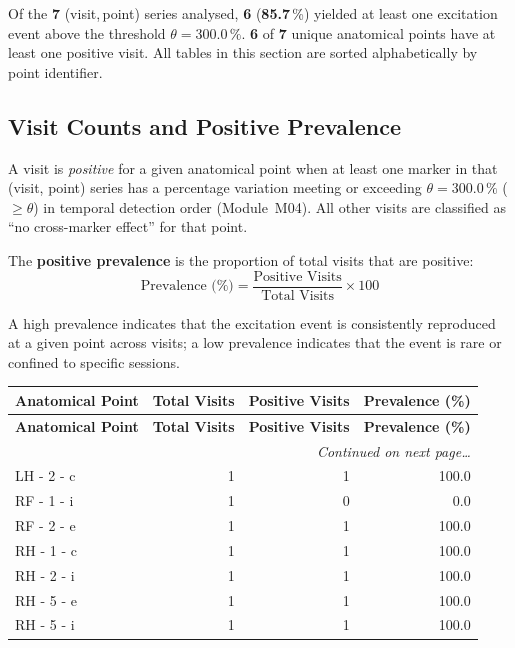 \documentclass[a4paper,11pt]{article}
\begin{document}
\noindent
Of the \textbf{7} (visit,\,point) series analysed,
\textbf{6} (\textbf{85.7}\,\%) yielded at least one
excitation event above the threshold $\theta = 300.0\,\%$.
\textbf{6} of \textbf{7} unique anatomical points
have at least one positive visit.
All tables in this section are sorted alphabetically by point identifier.

\subsection{Visit Counts and Positive Prevalence}

A visit is \emph{positive} for a given anatomical point when at least one marker in that
(visit, point) series has a percentage variation meeting or exceeding
$\theta = 300.0\,\%$ ($\geq \theta$) in temporal detection order (Module~M04).
All other visits are classified as ``no cross-marker effect'' for that point.

The \textbf{positive prevalence} is the proportion of total visits that are positive:
\[
  \text{Prevalence (\%)} = \frac{\text{Positive Visits}}{\text{Total Visits}} \times 100
\]

A high prevalence indicates that the excitation event is consistently reproduced at a given
point across visits; a low prevalence indicates that the event is rare or confined to
specific sessions.

\begin{small}
\begin{longtable}{p{5cm}rrr}
\toprule
\textbf{Anatomical Point} &
\textbf{Total Visits} &
\textbf{Positive Visits} &
\textbf{Prevalence (\%)} \\
\midrule
\endfirsthead
\toprule
\textbf{Anatomical Point} &
\textbf{Total Visits} &
\textbf{Positive Visits} &
\textbf{Prevalence (\%)} \\
\midrule
\endhead
\midrule
\multicolumn{4}{r}{\small\emph{Continued on next page\ldots}} \\
\endfoot
\bottomrule
\endlastfoot
LH - 2 - c & 1 & 1 & 100.0 \\
RF - 1 - i & 1 & 0 & 0.0 \\
RF - 2 - e & 1 & 1 & 100.0 \\
RH - 1 - c & 1 & 1 & 100.0 \\
RH - 2 - i & 1 & 1 & 100.0 \\
RH - 5 - e & 1 & 1 & 100.0 \\
RH - 5 - i & 1 & 1 & 100.0 \\
\end{longtable}
\end{small}
\end{document}
